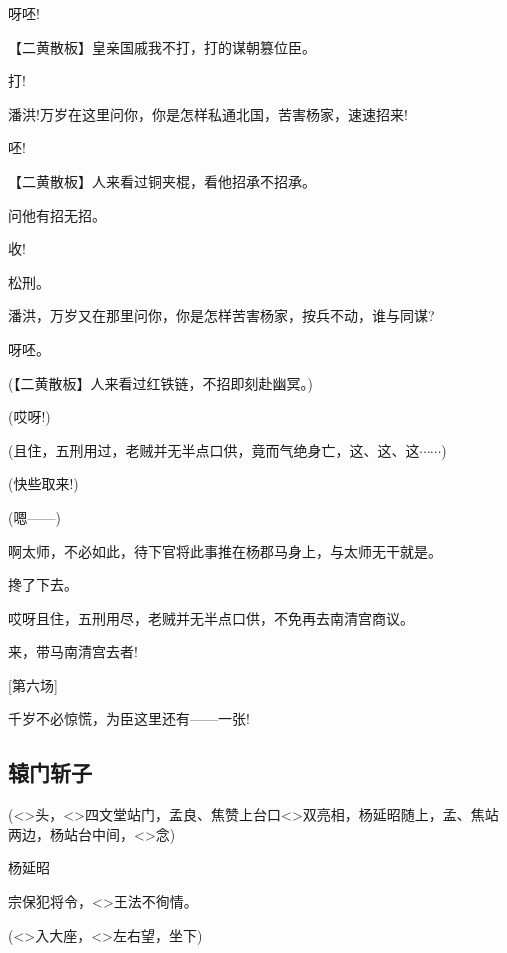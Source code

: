 {{呀呸!}

\setlength{\hangindent}{60pt} {【{\akai 二黄散板}】皇亲国戚我不打，打的谋朝篡位臣。}

{打!}

{潘洪!万岁在这里问你，你是怎样私通北国，苦害杨家，速速招来!}

{呸!}

\setlength{\hangindent}{60pt} {【{\akai 二黄散板}】人来看过铜夹棍，看他招承不招承。}

{问他有招无招。}

{收!}

{松刑。}

{潘洪，万岁又在那里问你，你是怎样苦害杨家，按兵不动，谁与同谋?}

{呀呸。}

{(【{\akai 二黄散板}】人来看过红铁链，不招即刻赴幽冥。)}

{(哎呀!)}

{(且住，五刑用过，老贼并无半点口供，竟而气绝身亡，这、这、这$\cdots{}\cdots{}$)}

{(快些取来!)}

{(嗯------)}

{啊太师，不必如此，待下官将此事推在杨郡马身上，与太师无干就是。}

{搀了下去。}

{哎呀且住，五刑用尽，老贼并无半点口供，不免再去南清宫商议。}

{来，带马南清宫去者!}

{[}第六场{]}

{千岁不必惊慌，为臣这里还有------一张!}

\newpage

\hypertarget{ux8f95ux95e8ux65a9ux5b50}{%

\subsection{辕门斩子}\label{ux8f95ux95e8ux65a9ux5b50}}

(\textless{}\!\textgreater{}头，\textless{}\!\textgreater{}四文堂站门，孟良、焦赞上台口\textless{}\!\textgreater{}双亮相，杨延昭随上，孟、焦站两边，杨站台中间，\textless{}\!\textgreater{}念)

杨延昭

宗保犯将令，\textless{}\!\textgreater{}王法不徇情。

(\textless{}\!\textgreater{}入大座，\textless{}\!\textgreater{}左右望，坐下)

}
